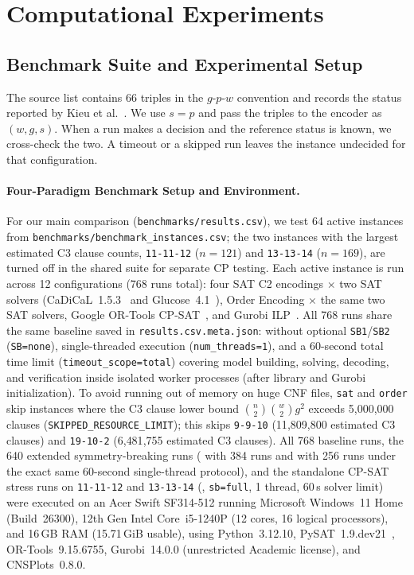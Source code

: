 \documentclass[a4paper,fleqn]{cas-sc}
\begin{document}
\section{Computational Experiments}
\label{sec:experiments}

\subsection{Benchmark Suite and Experimental Setup}
\label{sec:exp_setup}

The source list contains 66 triples in the $g$-$p$-$w$ convention and
records the status reported by Kieu et al.~\cite{kieu2025nse}.
We use $s=p$ and pass the triples to the encoder as $(w,g,s)$.
When a run makes a decision and the reference status is known, we
cross-check the two. A timeout or a skipped run leaves the instance undecided
for that configuration.

\paragraph{Four-Paradigm Benchmark Setup and Environment.}
For our main comparison (\texttt{benchmarks/results.csv}), we test 64 active instances from \texttt{benchmarks/benchmark\_instances.csv}; the two instances with the largest estimated C3 clause counts, \texttt{11-11-12} ($n=121$) and \texttt{13-13-14} ($n=169$), are turned off in the shared suite for separate CP testing. Each active instance is run across 12 configurations (768 runs total): four SAT C2 encodings $\times$ two SAT solvers (CaDiCaL~1.5.3~\cite{cadical153} and Glucose~4.1~\cite{audemard2018glucose}), Order Encoding $\times$ the same two SAT solvers, Google OR-Tools CP-SAT~\cite{ortools}, and Gurobi ILP~\cite{gurobi}. All 768 runs share the same baseline saved in \texttt{results.csv.meta.json}: without optional \texttt{SB1}/\texttt{SB2} (\texttt{SB=none}), single-threaded execution (\texttt{num\_threads=1}), and a 60-second total time limit (\texttt{timeout\_scope=total}) covering model building, solving, decoding, and verification inside isolated worker processes (after library and Gurobi initialization). To avoid running out of memory on huge CNF files, \texttt{sat} and \texttt{order} skip instances where the C3 clause lower bound $\binom{n}{2}\binom{w}{2}g^2$ exceeds 5{,}000{,}000 clauses (\texttt{SKIPPED\_RESOURCE\_LIMIT}); this skips \texttt{9-9-10} (11{,}809{,}800 estimated C3 clauses) and \texttt{19-10-2} (6{,}481{,}755 estimated C3 clauses). All 768 baseline runs, the 640 extended symmetry-breaking runs ( with 384 runs and  with 256 runs under the exact same 60-second single-thread protocol), and the standalone CP-SAT stress runs on \texttt{11-11-12} and \texttt{13-13-14} (, \texttt{sb=full}, 1 thread, 60\,s solver limit) were executed on an Acer Swift SF314-512 running Microsoft Windows~11 Home (Build~26300), 12th Gen Intel Core~i5-1240P (12 cores, 16 logical processors), and 16\,GB RAM (15.71\,GiB usable), using Python~3.12.10, PySAT~1.9.dev21~\cite{imms2018pysat}, OR-Tools~9.15.6755, Gurobi~14.0.0 (unrestricted Academic license), and CNSPlots~0.8.0.
\end{document}
